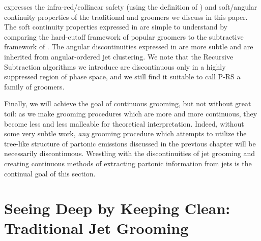  expresses the infra-red/collinear safety (using the definition of ) and soft/angular continuity properties of the traditional and \PIRANHA{} groomers we discuss in this paper.
%
The soft continuity properties expressed in  are simple to understand by comparing the hard-cutoff framework of popular groomers to the subtractive framework of \PIRANHA{}.
%
The angular discontinuities expressed in  are more subtle and are inherited from angular-ordered jet clustering.
%
We note that the Recursive Subtraction algorithms we introduce are discontinuous only in a highly suppressed region of phase space, and we still find it suitable to call P-RS a family of \PIRANHA{} groomers.


Finally, we will achieve the goal of continuous grooming, but not without great toil:
%
as we make grooming procedures which are more and more continuous, they become less and less malleable for theoretical interpretation.
%
Indeed, without some very subtle work, \textit{any} grooming procedure which attempts to utilize the tree-like structure of partonic emissions discussed in the previous chapter will be necessarily discontinuous.
%
Wrestling with the discontinuities of jet grooming and creating continuous methods of extracting partonic information from jets is the continual goal of this section.




\section{Seeing Deep by Keeping Clean: Traditional Jet Grooming}
\label{sec:traditional-grooming}




